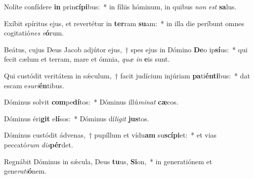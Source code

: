 \item Nolíte confídere \textbf{in} prin\textbf{cí}\textbf{pi}bus:~* in fíliis hóminum, in quibus \textit{non} \textit{est} \textbf{sa}lus.
\item Exíbit spíritus ejus, et revertétur in \textbf{ter}ram \textbf{su}am:~* in illa die períbunt omnes cogitatió\textit{nes} \textit{e}\textbf{ó}rum.
\item Beátus, cujus Deus Jacob adjútor ejus,~† spes ejus in Dómino \textbf{De}o ip\textbf{sí}us:~* qui fecit cælum et terram, mare et ómnia, \textit{quæ} \textit{in} \textbf{e}is sunt.
\item Qui custódit veritátem in sǽculum,~† facit judícium injúriam \textbf{pa}ti\textbf{én}\textbf{ti}bus:~* dat escam e\textit{su}\textit{ri}\textbf{én}tibus.
\item Dóminus solvit \textbf{com}pe\textbf{dí}tos:~* Dóminus illú\textit{mi}\textit{nat} \textbf{cæ}cos.
\item Dóminus éri\textbf{git} e\textbf{lí}sos:~* Dóminus dí\textit{li}\textit{git} \textbf{jus}tos.
\item Dóminus custódit ádvenas,~† pupíllum et vídu\textbf{am} su\textbf{scí}\textbf{pi}et:~* et vias peccató\textit{rum} \textit{dis}\textbf{pér}det.
\item Regnábit Dóminus in sǽcula, Deus \textbf{tu}us, \textbf{Si}on,~* in generatiónem et gene\textit{ra}\textit{ti}\textbf{ó}nem.
